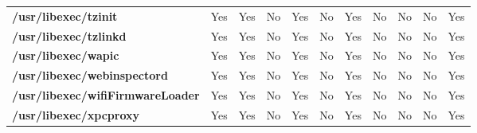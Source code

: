 \begin{center}
{\begin{tabular}{|>{\bfseries} l | C | C | C | C | C | C | C | C | C | C |}
					/usr/libexec/tzinit & Yes & Yes & \color{green}No & \color{red}Yes & \color{green}No & \color{red}Yes & No & No & \color{green}No & \color{red}Yes\\ 
					/usr/libexec/tzlinkd & Yes & Yes & \color{green}No & \color{red}Yes & \color{green}No & \color{red}Yes & No & No & \color{green}No & \color{red}Yes\\ 
					/usr/libexec/wapic & Yes & Yes & \color{green}No & \color{red}Yes & \color{green}No & \color{red}Yes & No & No & \color{green}No & \color{red}Yes\\ 
					/usr/libexec/webinspectord & Yes & Yes & \color{green}No & \color{red}Yes & \color{green}No & \color{red}Yes & No & No & \color{green}No & \color{red}Yes\\ 
					/usr/libexec/wifiFirmwareLoader & Yes & Yes & \color{green}No & \color{red}Yes & \color{green}No & \color{red}Yes & No & No & \color{green}No & \color{red}Yes\\ 
					/usr/libexec/xpcproxy & Yes & Yes & \color{green}No & \color{red}Yes & \color{green}No & \color{red}Yes & No & No & \color{green}No & \color{red}Yes\\ 

			\end{tabular}
		}
	\end{center}



